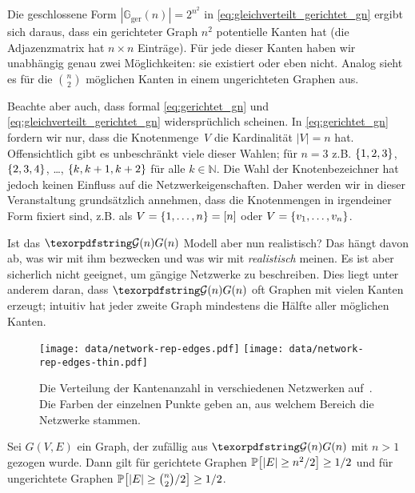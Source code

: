Die geschlossene Form $| \mathbb G_\text{ger}(n) | = 2^{n^2}$ in \cref{eq:gleichverteilt_gerichtet_gn} ergibt sich daraus, dass ein gerichteter Graph $n^2$ potentielle Kanten hat (die Adjazenzmatrix hat $n \times n$ Einträge).
Für jede dieser Kanten haben wir unabhängig genau zwei Möglichkeiten: sie existiert oder eben nicht.
Analog sieht es für die $\binom n 2$ möglichen Kanten in einem ungerichteten Graphen aus.

Beachte aber auch, dass formal \cref{eq:gerichtet_gn} und \cref{eq:gleichverteilt_gerichtet_gn} widersprüchlich scheinen.
In \cref{eq:gerichtet_gn} fordern wir nur, dass die Knotenmenge~$V$ die Kardinalität $|V| = n$ hat.
Offensichtlich gibt es unbeschränkt viele dieser Wahlen; für $n=3$ z.B. $\left\{1,2,3\right\}$, $\left\{2,3,4\right\}$, \ldots, $\left\{k, k+1, k+2\right\}$ für alle $k \in \mathbb N$.
Die Wahl der Knotenbezeichner hat jedoch keinen Einfluss auf die Netzwerkeigenschaften.
Daher werden wir in dieser Veranstaltung grundsätzlich annehmen, dass die Knotenmengen in irgendeiner Form fixiert sind, z.B. als $V = \left\{1, \ldots, n\right\} = [n]$ oder $V = \left\{v_1, \ldots, v_n\right\}$.

\bigskip

Ist das $\Gn$ Modell aber nun realistisch?
Das hängt davon ab, was wir mit ihm bezwecken und was wir mit \emph{realistisch} meinen.
Es ist aber sicherlich nicht geeignet, um gängige Netzwerke zu beschreiben.
Dies liegt unter anderem daran, dass $\Gn$ oft Graphen mit vielen Kanten erzeugt;
intuitiv hat \glqq jeder zweite Graph\grqq{} mindestens die Hälfte aller möglichen Kanten.

\begin{figure}[t]
    \begin{center}
        \texttt{[image: data/network-rep-edges.pdf]}%
        \texttt{[image: data/network-rep-edges-thin.pdf]}%
    \end{center}
    \caption{
        Die Verteilung der Kantenanzahl in verschiedenen Netzwerken auf~\cite{networkrepository}.
        Die Farben der einzelnen Punkte geben an, aus welchem Bereich die Netzwerke stammen.
    }
    \label{fig:kantenanzahl}
\end{figure}


\begin{observation}
    Sei $G(V,E)$ ein Graph, der zufällig aus $\Gn$ mit $n > 1$ gezogen wurde.
    Dann gilt für gerichtete Graphen $\mathbb{P}\!\left[|E| \ge n^2 / 2\right] \ge 1/2$ und für ungerichtete Graphen $\mathbb{P}\!\left[|E| \ge \binom{n}{2} / 2\right] \ge 1/2$.
\end{observation}

